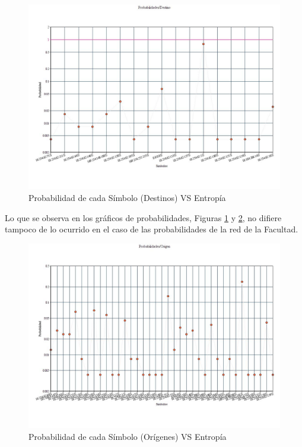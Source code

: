 \begin{figure}[H]
  \centering
    \includegraphics[scale=0.45]{imagenes/graficos/Probabilidades/04destino.jpg}
  \caption{Probabilidad de cada Símbolo (Destinos) VS Entropía}
  \label{fig:12}
\end{figure}

Lo que se observa en los gráficos de probabilidades, Figuras \ref{fig:12} y \ref{fig:13}, no difiere tampoco de lo ocurrido en el caso de las probabilidades de la red de la Facultad.

\begin{figure}[H]
  \centering
    \includegraphics[scale=0.45]{imagenes/graficos/Probabilidades/04origen.jpg}
  \caption{Probabilidad de cada Símbolo (Orígenes) VS Entropía}
  \label{fig:13}
\end{figure}

